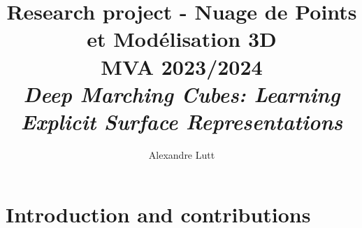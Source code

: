\documentclass[11pt]{article}
\title{Research project - Nuage de Points et Modélisation 3D \\ MVA 2023/2024 \\ \Large{\textit{Deep Marching Cubes: Learning Explicit Surface Representations}}}
\author{
Alexandre Lutt \email{alexandre.lutt@eleves.enpc.fr}
}
\begin{document}
\maketitle

\section{Introduction and contributions}

\paragraph{} \cite{shapenet}

\newpage

{\small


}
\end{document}
